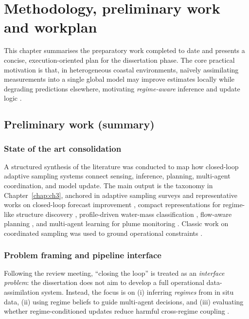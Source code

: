 
\chapter{Methodology, preliminary work and workplan}\label{chap:ch4}

This chapter summarises the preparatory work completed to date and presents a concise, execution-oriented plan for the dissertation phase.
The core practical motivation is that, in heterogeneous coastal environments, na\"ively assimilating measurements into a single global
model may improve estimates locally while degrading predictions elsewhere, motivating \emph{regime-aware} inference and update logic
\parencite{bernacchi2025closingloop,fossum2020compact,ge2023watermasses}.

\section{Preliminary work (summary)} \label{sec:prelim_work}

\subsection{State of the art consolidation}
A structured synthesis of the literature was conducted to map how closed-loop adaptive sampling systems connect sensing, inference,
planning, multi-agent coordination, and model update. The main output is the taxonomy in Chapter~\ref{chap:ch3}, anchored in adaptive
sampling surveys \parencite{hwang2019auvreview} and representative works on closed-loop forecast improvement
\parencite{bernacchi2025closingloop}, compact representations for regime-like structure discovery \parencite{fossum2020compact},
profile-driven water-mass classification \parencite{ge2023watermasses}, flow-aware planning \parencite{aguiar2018trajectoryopt},
and multi-agent learning for plume monitoring \parencite{dalfabbro2025douroplume}. Classic work on coordinated sampling was used to
ground operational constraints \parencite{das2012coordinated,curtin2009aosn}.

\subsection{Problem framing and pipeline interface}
Following the review meeting, ``closing the loop'' is treated as an \emph{interface problem}: the dissertation does not aim to develop
a full operational data-assimilation system. Instead, the focus is on (i) inferring \emph{regimes} from in situ data, (ii) using regime
beliefs to guide multi-agent decisions, and (iii) evaluating whether regime-conditioned updates reduce harmful cross-regime coupling
\parencite{bernacchi2025closingloop,fossum2020compact,ge2023watermasses}.

